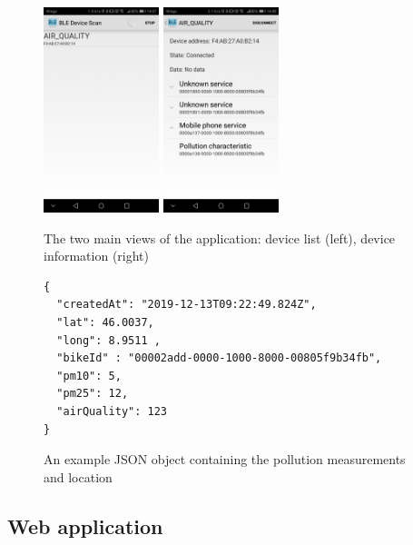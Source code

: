 \documentclass[12pt]{article}
\begin{document}
  \begin{figure}[H]
    \centering
    \includegraphics[width=0.3\textwidth]{images/android1.jpg}
    \includegraphics[width=0.3\textwidth]{images/android2.jpg}
    \caption{The two main views of the application: device list (left), device information (right)}
    \label{fig:app-scan-list}
  \end{figure}


  \begin{figure}[h]
    \centering
    \begin{verbatim}
{
  "createdAt": "2019-12-13T09:22:49.824Z",
  "lat": 46.0037,
  "long": 8.9511 ,
  "bikeId" : "00002add-0000-1000-8000-00805f9b34fb",
  "pm10": 5,
  "pm25": 12,
  "airQuality": 123
}
    \end{verbatim}
  \caption{An example JSON object containing the pollution measurements and location}\label{lst:json-packet}
  \end{figure}

  \subsection{Web application}
  \newpage
\end{document}

